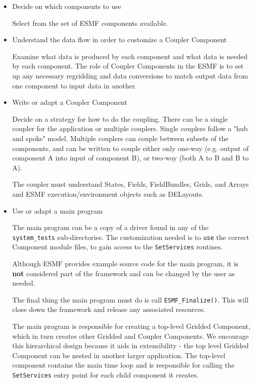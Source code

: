 \begin{itemize}

\item Decide on which components to use 

Select from the set of ESMF components available.

\item Understand the data flow in order to customize a Coupler Component

Examine what data is produced by each component and what data is
needed by each component.  The role of Coupler Components in the
ESMF is to set up any necessary regridding and data conversions
to match output data from one component to input data in another.

\item Write or adapt a Coupler Component

Decide on a strategy for how to do the coupling.  There can be a single
coupler for the application or multiple couplers.
Single couplers follow a "hub and
spoke" model.
Multiple couplers can couple between subsets of the components, and
can be written to couple either only one-way
(e.g. output of component A into input of component B), or two-way
(both A to B and B to A).  

The coupler must understand States, Fields, FieldBundles, 
Grids, and Arrays and ESMF execution/environment objects
such as DELayouts.    

\item Use or adapt a main program 

The main program can be a copy of a driver found in any of the
{\tt system_tests} sub-directories.  The customization needed is to
{\tt use} the correct Component module files, to gain access to the
{\tt SetServices} routines. 

Although ESMF provides example source code for the main program, it is
{\bf not} considered part of the framework and can be changed by
the user as needed.

The final thing the main program must do is call {\tt ESMF\_Finalize()}.
This will close down the framework and release any associated resources.

The main program is responsible for creating a top-level
Gridded Component, which in turn creates other Gridded and Coupler 
Components.  We encourage this hierarchical design because it
aids in extensibility - the top level Gridded Component can be
nested in another larger application.
The top-level component contains the main time loop and is 
responsible for calling the
{\tt SetServices} entry point for each child component it creates.

\end{itemize}



